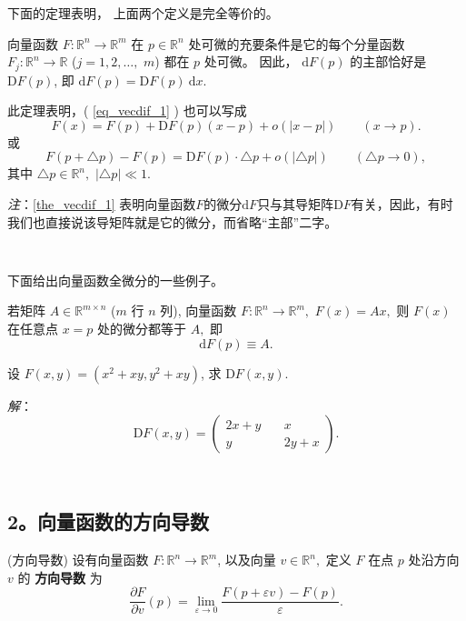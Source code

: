 下面的定理表明， 上面两个定义是完全等价的。 

\begin{theorem}{}\label{the_vecdif_1}
向量函数 $F:\mathbb{R}^{n}\rightarrow\mathbb{R}^{m}$ 在 $p\in\mathbb{R}^{n}$
处可微的充要条件是它的每个分量函数 $F_{j}:\mathbb{R}^{n}\rightarrow\mathbb{R}$ ($j=1,2,\ldots,$ $m$)
都在 $p$ 处可微。 因此， $\mathrm{d}F(p)$ 的主部恰好是 $\mathrm{D}F(p)$, 即 $\mathrm{d}F(p)=\mathrm{D}F(p)~\mathrm{d}x$.

此定理表明，( \autoref{eq_vecdif_1} ) 也可以写成
\[
  F(x)=F(p)+\mathrm{D}F(p)(x-p)+o(| x-p| )\quad\quad(x\rightarrow p).
\]
或
\[
F(p+\triangle p)-F(p)=\mathrm{D}F(p)\cdot\triangle p+o(|\triangle p|)\quad\quad(\triangle p\rightarrow0),
\]
其中 $\triangle p\in\mathbb{R}^{n},$ $|\triangle p|\ll1.$
\end{theorem}
\textsl{注}：\autoref{the_vecdif_1} 表明向量函数$F$的微分$\mathrm{d}F$只与其导矩阵$\mathrm{D}F$有关，因此，有时我们也直接说该导矩阵就是它的微分，而省略“主部”二字。

\verb| |

下面给出向量函数全微分的一些例子。
\begin{example}{}
若矩阵 $A\in\mathbb{R}^{m\times n}$ ($m$ 行 $n$ 列), 向量函数 $F:\mathbb{R}^{n}\rightarrow\mathbb{R}^{m},$
$F(x)=Ax,$ 则 $F(x)$ 在任意点 $x=p$ 处的微分都等于 $A,$ 即
\[
\mathrm{d}F(p)\equiv A.
\]
\end{example}

\begin{example}{}
设 $F(x,y)=(x^{2}+xy,y^{2}+xy)$, 求 $\mathrm{D}F(x,y).$

\textsl{解}：
$$
\mathrm{D}F(x,y)=\left(\begin{array}{cc}
2x+y\quad & x\\
y & 2y+x
\end{array}\right).
$$
\end{example}
\verb| |

\subsection{2。向量函数的方向导数}
\begin{definition}{(方向导数)}
设有向量函数 $F:\mathbb{R}^{n}\rightarrow\mathbb{R}^{m}$, 以及向量 $v\in\mathbb{R}^{n},$
定义 $F$ 在点 $p$ 处沿方向 $v$ 的 \textbf{方向导数} 为 
\[
{\displaystyle \frac{\partial F}{\partial v}(p)={\displaystyle \lim_{\varepsilon\rightarrow0}{\displaystyle \frac{F(p+\varepsilon v)-F(p)}{\varepsilon}}.}}
\]
\end{definition}

